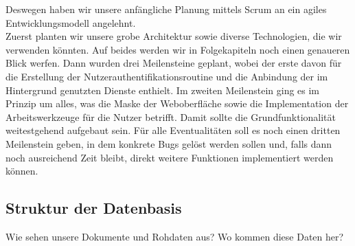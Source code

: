 \documentclass{article}
\begin{document}
Deswegen haben wir unsere anfängliche Planung mittels Scrum an ein agiles Entwicklungsmodell angelehnt.\\
Zuerst planten wir unsere grobe Architektur sowie diverse Technologien, die wir verwenden könnten.
Auf beides werden wir in Folgekapiteln noch einen genaueren Blick werfen. Dann wurden drei Meilensteine geplant,
wobei der erste davon für die Erstellung der Nutzerauthentifikationsroutine und die Anbindung der im Hintergrund genutzten Dienste enthielt.
Im zweiten Meilenstein ging es im Prinzip um alles, was die Maske der Weboberfläche sowie die Implementation der Arbeitswerkzeuge für die Nutzer betrifft.
Damit sollte die Grundfunktionalität weitestgehend aufgebaut sein. Für alle Eventualitäten soll es noch einen dritten Meilenstein geben,
in dem konkrete Bugs gelöst werden sollen und, falls dann noch ausreichend Zeit bleibt, direkt weitere Funktionen implementiert werden können.
\subsection{Struktur der Datenbasis}
Wie sehen unsere Dokumente und Rohdaten aus?
Wo kommen diese Daten her?
\end{document}
